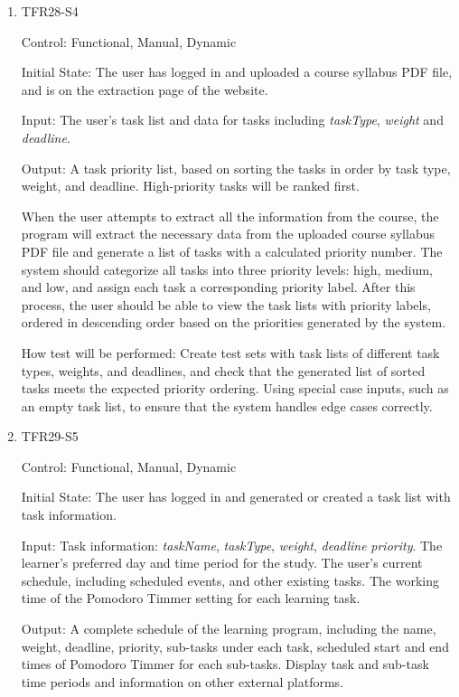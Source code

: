 \documentclass[12pt, titlepage]{article}
\begin{document}
\begin{enumerate}
\item{TFR28-S4\\} \label{TFR28-S4}

Control: Functional, Manual, Dynamic
					
Initial State: The user has logged in and uploaded a course syllabus PDF file, and is on the extraction page of the website. 
					
Input: The user's task list and data for tasks including \textit{taskType}, \textit{weight} and \textit{deadline}.
					
Output: A task priority list, based on sorting the tasks in order by task type, weight, and deadline. High-priority tasks will be ranked first.

When the user attempts to extract all the information from the course, the program will extract the necessary data from the uploaded course syllabus PDF file and generate a list of tasks with a calculated priority number. The system should categorize all tasks into three priority levels: high, medium, and low, and assign each task a corresponding priority label. After this process, the user should be able to view the task lists with priority labels, ordered in descending order based on the priorities generated by the system.
					
How test will be performed: Create test sets with task lists of different task types, weights, and deadlines, and check that the generated list of sorted tasks meets the expected priority ordering. Using special case inputs, such as an empty task list, to ensure that the system handles edge cases correctly.

\item{TFR29-S5\\} \label{TFR29-S5}

Control: Functional, Manual, Dynamic
					
Initial State: The user has logged in and generated or created a task list with task information.
					
Input: Task information: \textit{taskName}, \textit{taskType}, \textit{weight}, \textit{deadline} \textit{priority}. The learner's preferred day and time period for the study. The user's current schedule, including scheduled events, and other existing tasks. The working time of the Pomodoro Timmer setting for each learning task.
					
Output: A complete schedule of the learning program, including the name, weight, deadline, priority, sub-tasks under each task, scheduled start and end times of Pomodoro Timmer for each sub-tasks. Display task and sub-task time periods and information on other external platforms.


\end{enumerate}
\end{document}
